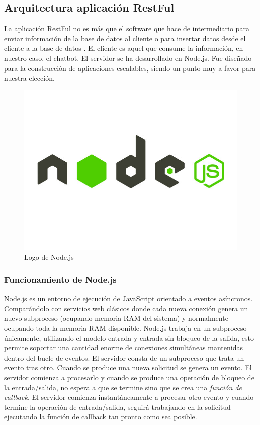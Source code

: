 \subsection{Arquitectura aplicación RestFul}

La aplicación RestFul no es más que el software que hace de intermediario para enviar información de la base de datos al cliente o para insertar datos desde el cliente a la base de datos \cite{apiRest}. El cliente es aquel que consume la información, en nuestro caso, el chatbot. El servidor se ha desarrollado en Node.js. Fue diseñado para la construcción de aplicaciones escalables, siendo un punto muy a favor para nuestra elección. 

\begin{figure}[h]
    \centering
    \includegraphics[scale=0.15]{include/figuras/node.jpg}
    \caption{Logo de Node.js}
    \label{fig:node}
\end{figure}

\subsubsection{Funcionamiento de Node.js}

Node.js es un entorno de ejecución de JavaScript \cite{javascript} orientado a eventos asíncronos. Comparándolo con servicios web clásicos donde cada nueva conexión genera un nuevo subproceso (ocupando memoria RAM del sistema) y normalmente ocupando toda la memoria RAM disponible. Node.js trabaja en un subproceso únicamente, utilizando el modelo entrada y entrada sin bloqueo de la salida, esto permite soportar una cantidad enorme de conexiones simultáneas mantenidas dentro del bucle de eventos. El servidor consta de un subproceso que trata un evento tras otro.
Cuando se produce una nueva solicitud se genera un evento. El servidor comienza a procesarlo y cuando se produce una operación de bloqueo de la entrada/salida, no espera a que se termine sino que se crea una \textit{función de callback}. El servidor comienza instantáneamente a procesar otro evento y cuando termine la operación de entrada/salida, seguirá trabajando en la solicitud ejecutando la función de callback tan pronto como sea posible.

